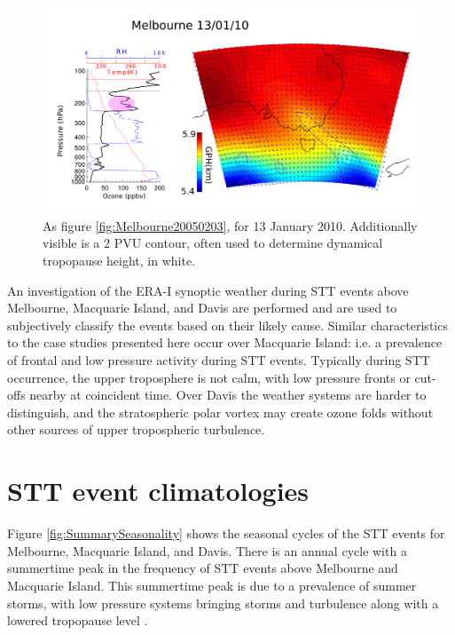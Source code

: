 \documentclass{article}
\begin{document}
  \begin{figure}[!htbp]
    \begin{center}
    \includegraphics[width=1.0\columnwidth]{figures/Melbourne20100113.png}
    \caption{As figure \ref{fig:Melbourne20050203}, for 13 January 2010.
     Additionally visible is a 2 PVU contour, often used to determine dynamical tropopause height, in white.}
    \label{fig:Melbourne20100113}
    \end{center}
  \end{figure}

  An investigation of the ERA-I synoptic weather during STT events above Melbourne, Macquarie Island, and Davis are performed and are used to subjectively classify the events based on their likely cause.
  Similar characteristics to the case studies presented here occur over Macquarie Island: i.e. a prevalence of frontal and low pressure activity during STT events.
  Typically during STT occurrence, the upper troposphere is not calm, with low pressure fronts or cut-offs nearby at coincident time.
  Over Davis the weather systems are harder to distinguish, and the stratospheric polar vortex may create ozone folds without other sources of upper tropospheric turbulence.

\section{STT event climatologies}

  Figure \ref{fig:SummarySeasonality} shows the seasonal cycles of the STT events for Melbourne, Macquarie Island, and Davis. 
  There is an annual cycle with a summertime peak in the frequency of STT events above Melbourne and Macquarie Island.
  This summertime peak is due to a prevalence of summer storms, with low pressure systems bringing storms and turbulence along with a lowered tropopause level \citep{Reutter2015}.
  
\end{document}
